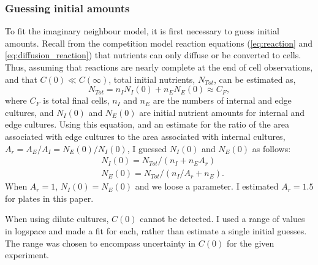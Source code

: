 
\subsubsection{Guessing initial amounts}
\label{sec:guessing_amounts}

To fit the imaginary neighbour model, it is first necessary to guess
initial amounts. Recall from the competition model reaction equations
(\ref{eq:reaction} and \ref{eq:diffusion_reaction}) that nutrients can
only diffuse or be converted to cells. Thus, assuming that reactions
are nearly complete at the end of cell observations, and that
\(C(0) \ll C(\infty)\), total initial nutrients, \(N_{Tot}\), can be
estimated as,
\begin{equation}
  \label{eq:N_Tot}
  N_{Tot} = n_{I}N_{I}(0) + n_{E}N_{E}(0) \approx C_{F},
\end{equation}
where \(C_{F}\) is total final cells, \(n_{I}\) and \(n_{E}\) are the
numbers of internal and edge cultures, and \(N_{I}(0)\) and
\(N_{E}(0)\) are initial nutrient amounts for internal and edge
cultures. Using this equation, and an estimate for the ratio of the
area associated with edge cultures to the area associated with
internal cultures, \(A_{r} = A_{E} / A_{I} = N_{E}(0) / N_{I}(0)\), I
guessed \(N_{I}(0)\) and \(N_{E}(0)\) as follows:
%
\begin{equation}
  \label{eq:N_0_guesses}
  \begin{aligned}
    &N_{I}(0) = N_{Tot} / (n_{I} + n_{E}A_{r})\\
    &N_{E}(0) = N_{Tot} / (n_{I}/A_{r} + n_{E}).
  \end{aligned}
\end{equation}
%
When \(A_{r} = 1\), \(N_{I}(0) = N_{E}(0)\) and we loose a
parameter. I estimated \(A_{r} = 1.5\) for plates in this paper.

When using dilute cultures, \(C(0)\) cannot be detected. I used a
range of values in logspace and made a fit for each, rather than
estimate a single initial guesses. The range was chosen to encompass
uncertainty in \(C(0)\) for the given experiment.


